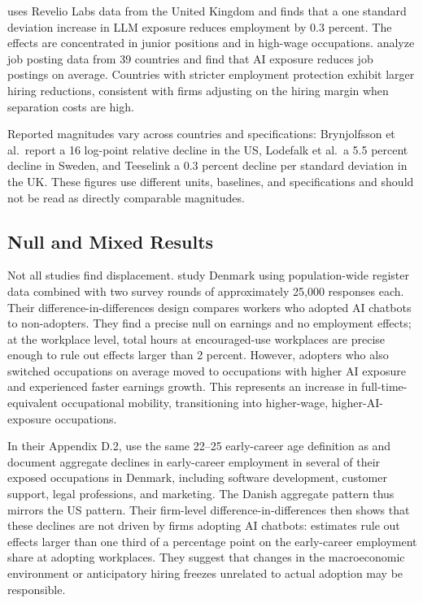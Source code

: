\cite{teeselink2025} uses Revelio Labs data from the United Kingdom and finds that a one standard deviation increase in LLM exposure reduces employment by 0.3 percent. The effects are concentrated in junior positions and in high-wage occupations. \cite{teeselink2026} analyze job posting data from 39 countries and find that AI exposure reduces job postings on average. Countries with stricter employment protection exhibit larger hiring reductions, consistent with firms adjusting on the hiring margin when separation costs are high.

Reported magnitudes vary across countries and specifications: Brynjolfsson et al.\ report a 16 log-point relative decline in the US, Lodefalk et al.\ a 5.5 percent decline in Sweden, and Teeselink a 0.3 percent decline per standard deviation in the UK. These figures use different units, baselines, and specifications and should not be read as directly comparable magnitudes.


\subsection{Null and Mixed Results}

Not all studies find displacement. \cite{humlum2026} study Denmark using population-wide register data combined with two survey rounds of approximately 25,000 responses each. Their difference-in-differences design compares workers who adopted AI chatbots to non-adopters. They find a precise null on earnings and no employment effects; at the workplace level, total hours at encouraged-use workplaces are precise enough to rule out effects larger than 2 percent. However, adopters who also switched occupations on average moved to occupations with higher AI exposure and experienced faster earnings growth. This represents an increase in full-time-equivalent occupational mobility, transitioning into higher-wage, higher-AI-exposure occupations.

In their Appendix D.2, \citet{humlum2026} use the same 22--25 early-career age definition as \citet{brynjolfsson2025} and document aggregate declines in early-career employment in several of their exposed occupations in Denmark, including software development, customer support, legal professions, and marketing. The Danish aggregate pattern thus mirrors the US pattern. Their firm-level difference-in-differences then shows that these declines are not driven by firms adopting AI chatbots: estimates rule out effects larger than one third of a percentage point on the early-career employment share at adopting workplaces. They suggest that changes in the macroeconomic environment or anticipatory hiring freezes unrelated to actual adoption may be responsible.


